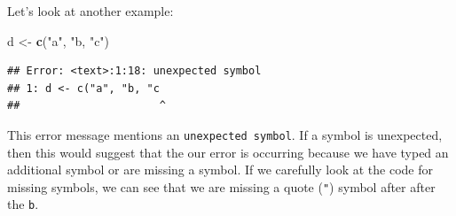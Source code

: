 \documentclass[]{book}
\newenvironment{Shaded}{\begin{snugshade}}{\end{snugshade}}
\newcommand{\KeywordTok}[1]{\textcolor[rgb]{0.13,0.29,0.53}{\textbf{#1}}}
\newcommand{\StringTok}[1]{\textcolor[rgb]{0.31,0.60,0.02}{#1}}
\newcommand{\NormalTok}[1]{#1}
\begin{document}
Let's look at another example:

\begin{Shaded}
\begin{Highlighting}[]
\NormalTok{d <-}\StringTok{ }\KeywordTok{c}\NormalTok{(}\StringTok{"a"}\NormalTok{, }\StringTok{"b, "}\NormalTok{c}\StringTok{")}
\end{Highlighting}
\end{Shaded}

\begin{verbatim}
## Error: <text>:1:18: unexpected symbol
## 1: d <- c("a", "b, "c
##                      ^
\end{verbatim}

This error message mentions an \texttt{unexpected\ symbol}. If a symbol
is unexpected, then this would suggest that the our error is occurring
because we have typed an additional symbol or are missing a symbol. If
we carefully look at the code for missing symbols, we can see that we
are missing a quote (\texttt{"}) symbol after after the \texttt{b}.


\end{document}

